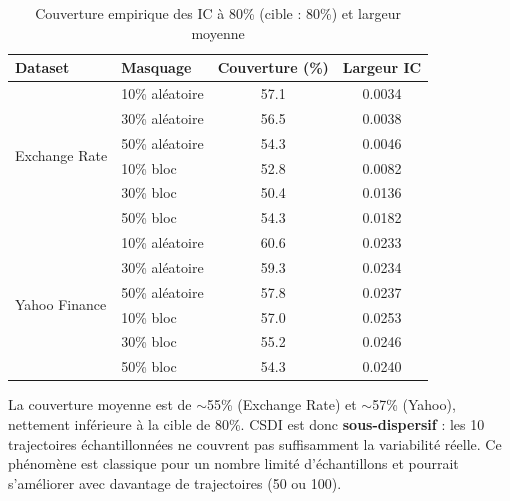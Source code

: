 \documentclass[12pt,a4paper]{article}
\begin{document}
\begin{table}[H]
\centering
\caption{Couverture empirique des IC \`a 80\% (cible : 80\%) et largeur moyenne}
\label{tab:coverage}
\begin{tabular}{llcc}
\toprule
\textbf{Dataset} & \textbf{Masquage} & \textbf{Couverture (\%)} & \textbf{Largeur IC} \\
\midrule
\multirow{6}{*}{Exchange Rate}
 & 10\% al\'eatoire & 57.1 & 0.0034 \\
 & 30\% al\'eatoire & 56.5 & 0.0038 \\
 & 50\% al\'eatoire & 54.3 & 0.0046 \\
 & 10\% bloc & 52.8 & 0.0082 \\
 & 30\% bloc & 50.4 & 0.0136 \\
 & 50\% bloc & 54.3 & 0.0182 \\
\midrule
\multirow{6}{*}{Yahoo Finance}
 & 10\% al\'eatoire & 60.6 & 0.0233 \\
 & 30\% al\'eatoire & 59.3 & 0.0234 \\
 & 50\% al\'eatoire & 57.8 & 0.0237 \\
 & 10\% bloc & 57.0 & 0.0253 \\
 & 30\% bloc & 55.2 & 0.0246 \\
 & 50\% bloc & 54.3 & 0.0240 \\
\bottomrule
\end{tabular}
\end{table}

La couverture moyenne est de $\sim$55\% (Exchange Rate) et $\sim$57\% (Yahoo), nettement inf\'erieure \`a la cible de 80\%. CSDI est donc \textbf{sous-dispersif} : les 10 trajectoires \'echantillonn\'ees ne couvrent pas suffisamment la variabilit\'e r\'eelle. Ce ph\'enom\`ene est classique pour un nombre limit\'e d'\'echantillons et pourrait s'am\'eliorer avec davantage de trajectoires (50 ou 100).
\end{document}
